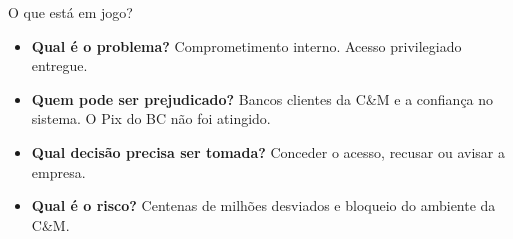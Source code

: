 \begin{frame}{O que está em jogo?}
  \small
  \begin{itemize}
    \item \textbf{Qual é o problema?} Comprometimento interno. Acesso privilegiado entregue.
    \item \textbf{Quem pode ser prejudicado?} Bancos clientes da C\&M e a confiança no sistema. O Pix do BC não foi atingido.
    \item \textbf{Qual decisão precisa ser tomada?} Conceder o acesso, recusar ou avisar a empresa.
    \item \textbf{Qual é o risco?} Centenas de milhões desviados e bloqueio do ambiente da C\&M.
  \end{itemize}
\end{frame}
